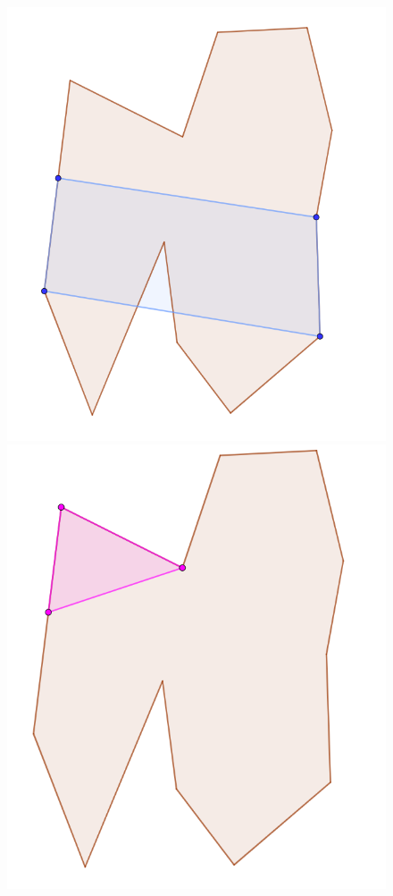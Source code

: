 \documentclass[12pt]{article}
\begin{document}
\begin{figure}[H]
    \caption{}
    \label{fig:intersectionPolygonSection2}
    \endminipage\hfill
    \includegraphics[width=\linewidth]{Images/intersection_yMonotoneSection3.png}
    \caption{}
    \label{fig:intersectionPolygonSection3}
    \endminipage\hfill
    \includegraphics[width=\linewidth]{Images/intersection_yMonotoneSection4.png}

\end{figure}
\end{document}
